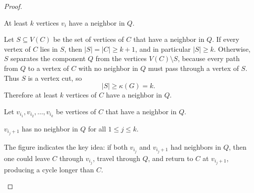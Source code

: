 \begin{proof}
    \begin{claim}
        At least \(k\) vertices \(v_i\) have a neighbor in \(Q\).
    \end{claim}

    \begin{explanation}
        Let \(S \subseteq V(C)\) be the set of vertices of \(C\) that have a neighbor in \(Q\). If every vertex of \(C\) lies in \(S\), then \(\vert S \vert = \vert C \vert \ge k + 1\), and in particular \(\vert S \vert \ge k\). Otherwise, \(S\) separates the component \(Q\) from the vertices \(V(C) \setminus S\), because every path from \(Q\) to a vertex of \(C\) with no neighbor in \(Q\) must pass through a vertex of \(S\). Thus \(S\) is a vertex cut, so
        \[
            \vert S \vert \ge \kappa (G) = k.
        \]
        Therefore at least \(k\) vertices of \(C\) have a neighbor in \(Q\).
    \end{explanation}

    Let \(v_{i_1}, v_{i_2}, \dots , v_{i_k}\) be vertices of \(C\) that have a neighbor in \(Q\).

    \begin{claim}
        \(v_{i_j+1}\) has no neighbor in \(Q\) for all \(1 \le j \le k\).
    \end{claim}

    \begin{explanation}

    The figure indicates the key idea: if both \(v_{i_j}\) and \(v_{i_j+1}\) had neighbors in \(Q\), then one could leave \(C\) through \(v_{i_j}\), travel through \(Q\), and return to \(C\) at \(v_{i_j+1}\), producing a cycle longer than \(C\).

    \begin{center}
    \end{center}
    \end{explanation}


\end{proof}
